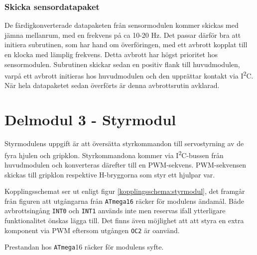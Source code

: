 \documentclass[11pt]{article}
\begin{document}
\begin{flushleft}
\subsubsection{Skicka sensordatapaket}
De färdigkonverterade datapaketen från sensormodulen kommer skickas med jämna mellanrum, med en frekvens på ca 10-20 Hz. Det passar därför bra att initiera subrutinen, som har hand om överföringen, med ett avbrott kopplat till en klocka med lämplig frekvens. Detta avbrott har högst prioritet hos sensormodulen. Subrutinen skickar sedan en positiv flank till huvudmodulen, varpå ett avbrott initieras hos huvudmodulen och den upprättar kontakt via I\textsuperscript{2}C. När hela datapaketet sedan överförts är denna avbrottsrutin avklarad.

\pagebreak
\section{Delmodul 3 - Styrmodul}
Styrmodulens uppgift är att översätta styrkommandon till servostyrning av de fyra hjulen och gripklon. Styrkommandona kommer via I\textsuperscript{2}C-bussen från huvudmodulen och konverteras därefter till en PWM-sekvens. PWM-sekvensen skickas till gripklon respektive H-bryggorna som styr ett hjulpar var. 

Kopplingsschemat ser ut enligt figur \ref{kopplingsschema:styrmodul}, det framgår från figuren att utgångarna från \verb+ATmega16+ räcker för modulens ändamål. Både avbrottsingång \verb+INT0+ och \verb+INT1+ används inte men reservas ifall ytterligare funktionalitet önskas lägga till. Det finns även möjlighet att att styra en extra komponent via PWM eftersom utgången \verb+OC2+ är oanvänd.  

Prestandan hos \verb+ATmega+16 räcker för modulens syfte. 


\end{flushleft}
\end{document}

